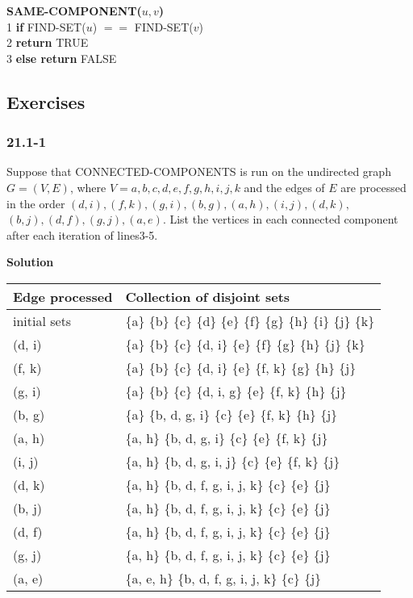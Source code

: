 \textbf{SAME-COMPONENT($u, v$)}\\
1\hspace*{2ex} \textbf{if} FIND-SET($u$) $==$ FIND-SET($v$)\\
2\hspace*{4ex} \textbf{return} TRUE\\
3\hspace*{2ex} \textbf{else return} FALSE

\subsection {Exercises}

\subsubsection {21.1-1}

Suppose that CONNECTED-COMPONENTS is run on the undirected graph $G = (V, E)$,
where $V = { a, b, c, d, e, f, g, h, i, j, k }$ and the edges of $E$ are
processed in the order $(d, i), (f, k), (g, i), (b, g), (a, h), (i, j), (d, k),$
$(b, j), (d, f), (g, j), (a, e)$. List the vertices in each connected component
after each iteration of lines3-5.

\textbf{Solution}

\begin{tabular}{l|l}
Edge processed & Collection of disjoint sets \\
\hline
initial sets   & \{a\} \{b\} \{c\} \{d\} \{e\} \{f\} \{g\} \{h\} \{i\} \{j\} \{k\} \\
(d, i)         & \{a\} \{b\} \{c\} \{d, i\} \{e\} \{f\} \{g\} \{h\} \{j\} \{k\} \\
(f, k)         & \{a\} \{b\} \{c\} \{d, i\} \{e\} \{f, k\} \{g\} \{h\} \{j\} \\
(g, i)         & \{a\} \{b\} \{c\} \{d, i, g\} \{e\} \{f, k\} \{h\} \{j\} \\
(b, g)         & \{a\} \{b, d, g, i\} \{c\} \{e\} \{f, k\} \{h\} \{j\} \\
(a, h)         & \{a, h\} \{b, d, g, i\} \{c\} \{e\} \{f, k\} \{j\} \\
(i, j)         & \{a, h\} \{b, d, g, i, j\} \{c\} \{e\} \{f, k\} \{j\} \\
(d, k)         & \{a, h\} \{b, d, f, g, i, j, k\} \{c\} \{e\} \{j\} \\
(b, j)         & \{a, h\} \{b, d, f, g, i, j, k\} \{c\} \{e\} \{j\} \\
(d, f)         & \{a, h\} \{b, d, f, g, i, j, k\} \{c\} \{e\} \{j\} \\
(g, j)         & \{a, h\} \{b, d, f, g, i, j, k\} \{c\} \{e\} \{j\} \\
(a, e)         & \{a, e, h\} \{b, d, f, g, i, j, k\} \{c\} \{j\} \\
\end{tabular}


